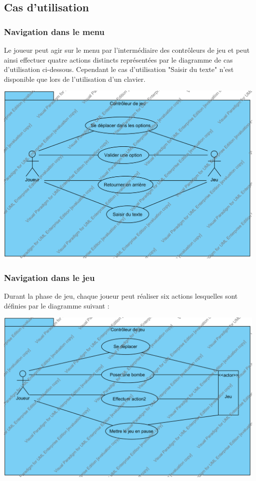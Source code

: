 
\subsection{Cas d'utilisation}

	\subsubsection{Navigation dans le menu}
	Le joueur peut agir sur le menu par l'intermédiaire des contrôleurs de jeu et peut ainsi effectuer quatre actions distincts représentées par le diagramme de cas d'utilisation ci-dessous. Cependant le cas d'utilisation "Saisir du texte" n'est disponible que lors de l'utilisation d'un clavier.
	
		\includegraphics{images/UML/UseCase/controller_navigMenu}
				
		
	\subsubsection{Navigation dans le jeu}
	Durant la phase de jeu, chaque joueur peut réaliser six actions lesquelles sont définies par le diagramme suivant :
	
		\includegraphics{images/UML/UseCase/controller_gameActions}
	
